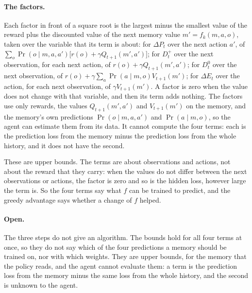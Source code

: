 \documentclass[11pt]{article}
\theoremstyle{definition}
\newcommand{\dE}{\Delta E}
\newcommand{\dP}{\Delta P}
\begin{document}
\paragraph{The factors.} Each factor in front of a square root is the largest minus the smallest value of the reward plus the discounted value of the next memory value $m'=f_k(m,a,o)$, taken over the variable that its term is about: for $\dP_t$ over the next action $a'$, of $\sum_o\Pr(o\mid m,a,a')\big[r(o)+\gamma Q_{t+1}(m',a')\big]$; for $D^+_t$ over the next observation, for each next action, of $r(o)+\gamma Q_{t+1}(m',a')$; for $D^0_t$ over the next observation, of $r(o)+\gamma\sum_a\Pr(a\mid m,o)V_{t+1}(m')$; for $\dE_t$ over the action, for each next observation, of $\gamma V_{t+1}(m')$. A factor is zero when the value does not change with that variable, and then its term adds nothing. The factors use only rewards, the values $Q_{t+1}(m',a')$ and $V_{t+1}(m')$ on the memory, and the memory's own predictions $\Pr(o\mid m,a,a')$ and $\Pr(a\mid m,o)$, so the agent can estimate them from its data. It cannot compute the four terms: each is the prediction loss from the memory minus the prediction loss from the whole history, and it does not have the second.

These are upper bounds. The terms are about observations and actions, not about the reward that they carry: when the values do not differ between the next observations or actions, the factor is zero and so is the hidden loss, however large the term is. So the four terms say what $f$ can be trained to predict, and the greedy advantage says whether a change of $f$ helped.

\paragraph{Open.} The three steps do not give an algorithm. The bounds hold for all four terms at once, so they do not say which of the four predictions a memory should be trained on, nor with which weights. They are upper bounds, for the memory that the policy reads, and the agent cannot evaluate them: a term is the prediction loss from the memory minus the same loss from the whole history, and the second is unknown to the agent.
\end{document}
